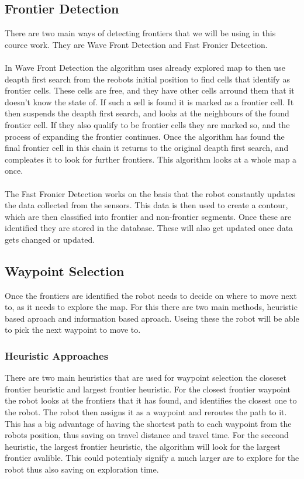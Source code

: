 \documentclass[a4paper,12pt]{article}
\begin{document}
			\subsection{Frontier Detection}
			There are two main ways of detecting frontiers that we will be using in this cource work. They are Wave Front Detection and 
			Fast Fronier Detection.
			\\
			\\
			In Wave Front Detection the algorithm uses already explored map to then use deapth first search from the 
			reobots initial position to find cells that identify as frontier cells. These cells are free, and they have other cells
			arround them that it doesn't know the state of. If such a sell is found it is marked as a frontier cell. It then suspends the deapth
			first search, and looks at the neighbours of the found frontier cell. If they also qualify to be frontier cells 
			they are marked so, and the process of expanding the frontier continues. Once the algorithm has found the final 
			frontier cell in this chain it returns to the original deapth first search, and compleates it to look for further frontiers.
			This algorithm looks at a whole map a once.
			\\
			\\
			The Fast Fronier Detection works on the basis that the robot constantly updates the data collected from the sensors.
			This data is then used to create a contour, which are then classified into frontier and non-frontier segments. Once these
			are identified they are stored in the database. These will also get updated once data gets changed or updated.
			\subsection{Waypoint Selection}
			Once the frontiers are identified the robot needs to decide on where to move next to, as it needs to explore the map.
			For this there are two main methods, heuristic based aproach and information based aproach. Useing these the robot will be able 
			to pick the next waypoint to move to.
			\subsubsection{Heuristic Approaches}
			There are two main heuristics that are used for waypoint selection the closeset frontier heuristic and largest frontier heuristic.
			For the closest frontier waypoint the robot looks at the frontiers that it has found, and identifies the closest one to the robot.
			The robot then assigns it as a waypoint and reroutes the path to it. This has a big advantage of having the shortest path to each waypoint
			from the robots position, thus saving on travel distance and travel time. For the seccond heuristic, the largest frontier heuristic, the 
			algorithm will look for the largest frontier avalible. This could potentialy signify a much larger are to explore for the robot thus also saving
			on exploration time.
\end{document}
